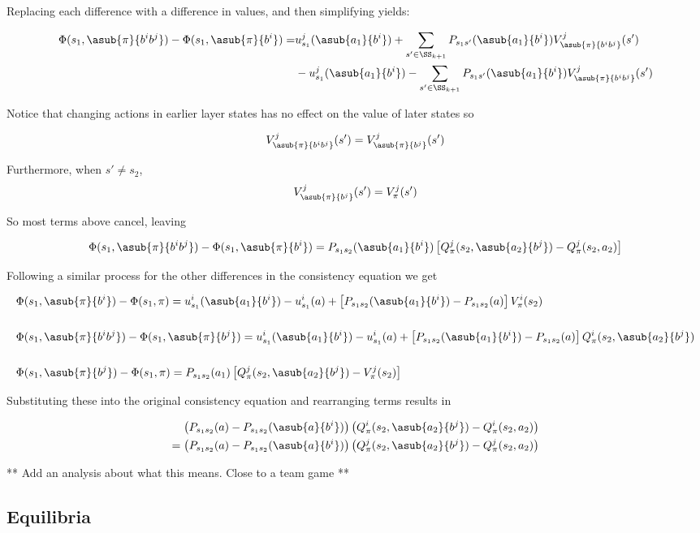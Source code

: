 Replacing each difference with a difference in values, and then simplifying yields:

\begin{align*}
\Phi(s_1,\asub{\pi}{b^ib^j}) - \Phi(s_1,\asub{\pi}{b^i}) = & u^j_{s_1}(\asub{a_1}{b^i}) + \sum_{s' \in \SS_{k+1}} P_{s_1s'}(\asub{a_1}{b^i})V^j_{\asub{\pi}{b^ib^j}}(s') \\
& - u^j_{s_1}(\asub{a_1}{b^i}) - \sum_{s' \in \SS_{k+1}} P_{s_1s'}(\asub{a_1}{b^i})V^j_{\asub{\pi}{b^ib^j}}(s')
\end{align*}

Notice that changing actions in earlier layer states has no effect on the value of later states so 

$$
V^j_{\asub{\pi}{b^ib^j}}(s') = V^j_{\asub{\pi}{b^j}}(s')
$$

Furthermore, when $s' \neq s_2$, 
$$
V^j_{\asub{\pi}{b^j}}(s') = V^j_{\pi}(s')
$$

So most terms above cancel, leaving

$$
\Phi(s_1,\asub{\pi}{b^ib^j}) - \Phi(s_1,\asub{\pi}{b^i}) = P_{s_1s_2}(\asub{a_1}{b^i}) \left[Q^j_{\pi}(s_2, \asub{a_2}{b^j}) - Q^j_{\pi}(s_2, a_2)\right]
$$

Following a similar process for the other differences in the consistency equation we get

\begin{align*}
&\Phi(s_1,\asub{\pi}{b^i}) - \Phi(s_1,\pi) = u^i_{s_1}(\asub{a_1}{b^i}) - u^i_{s_1}(a) + \left[P_{s_1s_2}(\asub{a_1}{b^i}) - P_{s_1s_2}(a)\right] V^i_{\pi}(s_2) \\
&\\
&\Phi(s_1,\asub{\pi}{b^ib^j}) - \Phi(s_1,\asub{\pi}{b^j}) = u^i_{s_1}(\asub{a_1}{b^i}) - u^i_{s_1}(a) + \left[P_{s_1s_2}(\asub{a_1}{b^i}) - P_{s_1s_2}(a)\right] Q^i_{\pi}(s_2, \asub{a_2}{b^j})\\
&\\
&\Phi(s_1,\asub{\pi}{b^j}) - \Phi(s_1,\pi) = P_{s_1s_2}(a_1) \left[Q^j_{\pi}(s_2, \asub{a_2}{b^j}) - V^j_{\pi}(s_2)\right]
\end{align*}


Substituting these into the original consistency equation and rearranging terms results in

\begin{align*}
\left(P_{s_1s_2}(a) - P_{s_1s_2}(\asub{a}{b^i}) \right)\left(Q^i_{\pi}(s_2, \asub{a_2}{b^j}) - Q^i_{\pi}(s_2, a_2)\right) \\
= \left(P_{s_1s_2}(a) - P_{s_1s_2}(\asub{a}{b^i}) \right)\left(Q^j_{\pi}(s_2, \asub{a_2}{b^j}) - Q^j_{\pi}(s_2, a_2)\right)
\end{align*}


** Add an analysis about what this means. Close to a team game **

\subsection{Equilibria}
